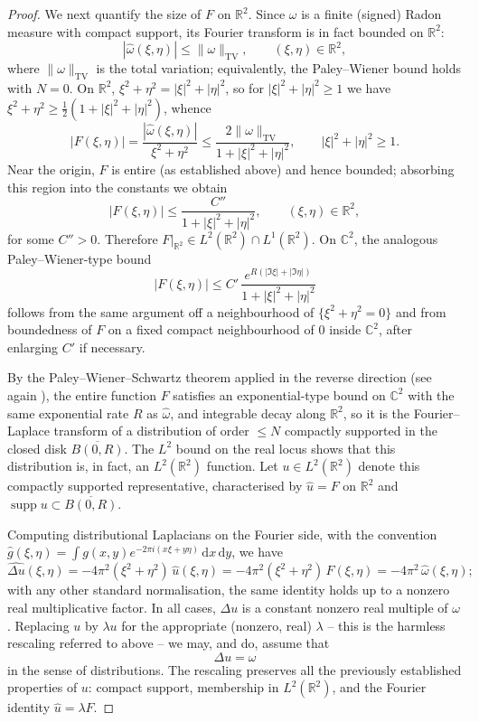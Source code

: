\documentclass[a4paper,11pt,reqno]{amsart}
\numberwithin{equation}{section}
\theoremstyle{plain} %
\theoremstyle{definition} %
\theoremstyle{remark}
\newcommand{\R}{\mathbb{R}}
\newcommand{\C}{\mathbb{C}}
\begin{document}
\begin{proof}
We next quantify the size of $F$ on $\R^2$. Since $\omega$ is a finite
(signed) Radon measure with compact support, its Fourier transform is in
fact bounded on $\R^2$:
\[
|\widehat{\omega}(\xi,\eta)|\le \|\omega\|_{\mathrm{TV}},
\qquad (\xi,\eta)\in\R^2,
\]
where $\|\omega\|_{\mathrm{TV}}$ is the total variation; equivalently,
the Paley--Wiener bound holds with $N=0$. On $\R^2$, $\xi^2+\eta^2=
|\xi|^2+|\eta|^2$, so for $|\xi|^2+|\eta|^2\ge 1$ we have $\xi^2+\eta^2
\ge \tfrac{1}{2}(1+|\xi|^2+|\eta|^2)$, whence
\[
|F(\xi,\eta)|=\frac{|\widehat\omega(\xi,\eta)|}{\xi^2+\eta^2}
\le \frac{2\|\omega\|_{\mathrm{TV}}}{1+|\xi|^2+|\eta|^2},
\qquad |\xi|^2+|\eta|^2\ge 1.
\]
Near the origin, $F$ is entire (as established above) and hence bounded;
absorbing this region into the constants we obtain
\[
|F(\xi,\eta)|\le \frac{C''}{1+|\xi|^2+|\eta|^2},
\qquad (\xi,\eta)\in\R^2,
\]
for some $C''>0$. Therefore $F|_{\R^2}\in L^2(\R^2)\cap L^1(\R^2)$. On
$\C^2$, the analogous Paley--Wiener-type bound
\[
|F(\xi,\eta)|\le C'\,
\frac{e^{R(|\Im \xi|+|\Im \eta|)}}{1+|\xi|^2+|\eta|^2}
\]
follows from the same argument off a neighbourhood of $\{\xi^2+\eta^2=0\}$
and from boundedness of $F$ on a fixed compact neighbourhood of $0$ inside
$\C^2$, after enlarging $C'$ if necessary.

By the Paley--Wiener--Schwartz theorem applied in the reverse direction
(see again \cite[Theorem~7.3.1]{Hormander}), the entire function $F$
satisfies an exponential-type bound on $\C^2$ with the same exponential
rate $R$ as $\widehat\omega$, and integrable decay along $\R^2$, so it is
the Fourier--Laplace transform of a distribution of order $\le N$
compactly supported in the closed disk $\overline{B(0,R)}$. The $L^2$
bound on the real locus shows that this distribution is, in fact, an
$L^2(\R^2)$ function. Let $u\in L^2(\R^2)$ denote this compactly supported
representative, characterised by $\widehat u = F$ on $\R^2$ and
$\operatorname{supp} u\subset \overline{B(0,R)}$.

Computing distributional Laplacians on the Fourier side, with the
convention $\widehat g(\xi,\eta)=\int g(x,y)e^{-2\pi i(x\xi+y\eta)}\,
\mathrm{d}x\,\mathrm{d}y$, we have
\[
\widehat{\Delta u}(\xi,\eta) = -4\pi^2(\xi^2+\eta^2)\,\widehat{u}(\xi,\eta)
= -4\pi^2(\xi^2+\eta^2)\,F(\xi,\eta) = -4\pi^2\,\widehat\omega(\xi,\eta);
\]
with any other standard normalisation, the same identity holds up to a
nonzero real multiplicative factor. In all cases, $\Delta u$ is a constant
nonzero real multiple of $\omega$. Replacing $u$ by $\lambda u$ for the
appropriate (nonzero, real) $\lambda$ -- this is the harmless rescaling
referred to above -- we may, and do, assume that
\[
\Delta u = \omega
\]
in the sense of distributions. The rescaling preserves all the previously
established properties of $u$: compact support, membership in $L^2(\R^2)$,
and the Fourier identity $\widehat u = \lambda F$.


\end{proof}
\end{document}
